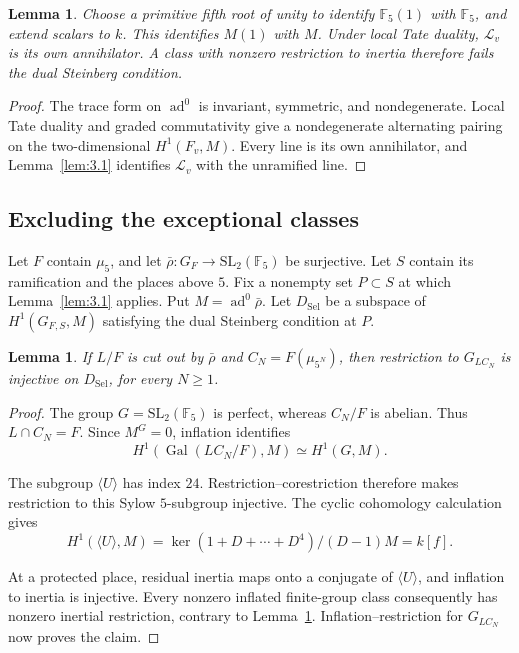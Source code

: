 \documentclass[11pt,a4paper]{article}
\newtheorem{lemma}[theorem]{Lemma}
\numberwithin{equation}{section}
\begin{document}
\begin{lemma}\label{lem:3.2}
Choose a primitive fifth root of unity to identify \(\mathbb F_5(1)\) with \(\mathbb F_5\), and extend scalars to \(k\). This identifies \(M(1)\) with \(M\). Under local Tate duality, \(\mathcal L_v\) is its own annihilator. A class with nonzero restriction to inertia therefore fails the dual Steinberg condition.
\end{lemma}

\begin{proof}
The trace form on \(\operatorname{ad}^0\) is invariant, symmetric, and nondegenerate. Local Tate duality and graded commutativity give a nondegenerate alternating pairing on the two-dimensional \(H^1(F_v,M)\). Every line is its own annihilator, and Lemma~\ref{lem:3.1} identifies \(\mathcal L_v\) with the unramified line.
\end{proof}

\subsection*{Excluding the exceptional classes}

Let \(F\) contain \(\mu_5\), and let \(\bar\rho:G_F\to\mathrm{SL}_2(\mathbb F_5)\) be surjective. Let \(S\) contain its ramification and the places above \(5\). Fix a nonempty set \(P\subset S\) at which Lemma~\ref{lem:3.1} applies. Put \(M=\operatorname{ad}^0\bar\rho\). Let \(D_{\mathrm{Sel}}\) be a subspace of \(H^1(G_{F,S},M)\) satisfying the dual Steinberg condition at \(P\).

\begin{lemma}\label{lem:3.3}
If \(L/F\) is cut out by \(\bar\rho\) and \(C_N=F(\mu_{5^N})\), then restriction to \(G_{LC_N}\) is injective on \(D_{\mathrm{Sel}}\), for every \(N\geq1\).
\end{lemma}

\begin{proof}
The group \(G=\mathrm{SL}_2(\mathbb F_5)\) is perfect, whereas \(C_N/F\) is abelian. Thus \(L\cap C_N=F\). Since \(M^G=0\), inflation identifies
\begin{equation*}
H^1(\operatorname{Gal}(LC_N/F),M)\simeq H^1(G,M).
\end{equation*}

The subgroup \(\langle U\rangle\) has index \(24\). Restriction--corestriction therefore makes restriction to this Sylow \(5\)-subgroup injective. The cyclic cohomology calculation gives
\begin{equation*}
H^1(\langle U\rangle,M)
=\ker(1+D+\cdots+D^4)/(D-1)M=k[f].
\end{equation*}

At a protected place, residual inertia maps onto a conjugate of \(\langle U\rangle\), and inflation to inertia is injective. Every nonzero inflated finite-group class consequently has nonzero inertial restriction, contrary to Lemma~\ref{lem:3.2}. Inflation--restriction for \(G_{LC_N}\) now proves the claim.
\end{proof}
\end{document}
